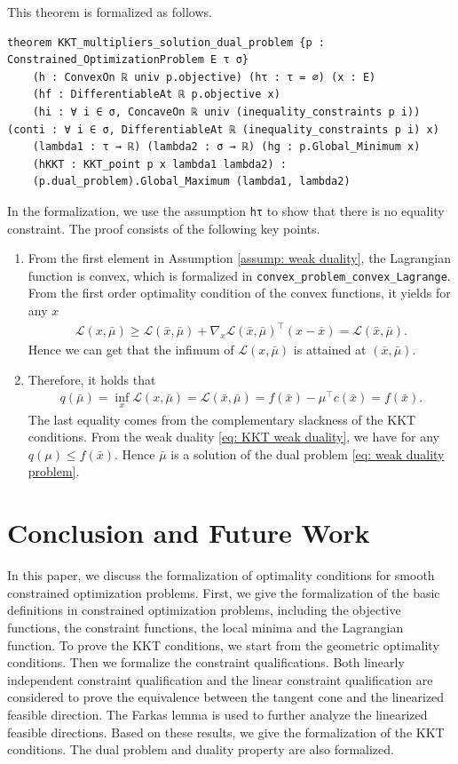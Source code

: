 \documentclass[sn-mathphys]{JORSC-jnl}%
\theoremstyle{thmstyleone}%
\theoremstyle{thmstylethree}%
\newcommand{\lean}[1]{\lstinline[language=lean, mathescape=true]{#1}}
\begin{document}
This theorem is formalized as follows.
\begin{lstlisting}
theorem KKT_multipliers_solution_dual_problem {p : Constrained_OptimizationProblem E τ σ}
    (h : ConvexOn ℝ univ p.objective) (hτ : τ = ∅) (x : E)
    (hf : DifferentiableAt ℝ p.objective x) 
    (hi : ∀ i ∈ σ, ConcaveOn ℝ univ (inequality_constraints p i)) (conti : ∀ i ∈ σ, DifferentiableAt ℝ (inequality_constraints p i) x)
    (lambda1 : τ → ℝ) (lambda2 : σ → ℝ) (hg : p.Global_Minimum x)
    (hKKT : KKT_point p x lambda1 lambda2) :
    (p.dual_problem).Global_Maximum (lambda1, lambda2) 
\end{lstlisting}
In the formalization, we use the assumption \lean{hτ} to show that there is no equality constraint. The proof consists of the following key points.
\begin{enumerate}
    \item From the first element in Assumption \ref{assump: weak duality}, the Lagrangian function is convex, which is formalized in \lean{convex_problem_convex_Lagrange}. From the first order optimality condition of the convex functions, it yields for any $x$
    \begin{align*}
        \mathcal{L}(x, \bar{\mu}) \geq \mathcal{L}(\bar{x}, \bar{\mu}) + \nabla_x \mathcal{L}(\bar{x}, \bar{\mu}) ^\top (x-\bar{x}) = \mathcal{L}(\bar{x}, \bar{\mu}).
    \end{align*}
    Hence we can get that the infimum of $\mathcal{L}(x, \bar{\mu})$ is attained at $(\bar{x}, \bar{\mu})$.
    \item Therefore, it holds that
    \begin{align*}
        q(\bar{\mu}) = \inf_x \mathcal{L}(x, \bar{\mu}) = \mathcal{L}(\bar{x}, \bar{\mu}) = f(\bar{x}) -\mu^\top c(\bar{x}) = f(\bar{x}).
    \end{align*}
    The last equality comes from the complementary slackness of the KKT conditions. From the weak duality \eqref{eq: KKT weak duality}, we have for any $q(\mu) \leq f(\bar{x})$. Hence $\bar{\mu}$ is a solution of the dual problem \eqref{eq: weak duality problem}. 
\end{enumerate}
\section{Conclusion and Future Work}\label{sec: conclution}
In this paper, we discuss the formalization of optimality conditions for smooth constrained optimization problems. First, we give the formalization of the basic definitions in constrained optimization problems, including the objective functions, the constraint functions, the local minima and the Lagrangian function. To prove the KKT conditions, we start from the geometric optimality conditions. Then we formalize the constraint qualifications. Both linearly independent constraint qualification and the linear constraint qualification are considered to prove the equivalence between the tangent cone and the linearized feasible direction. The Farkas lemma is used to further analyze the linearized feasible directions. Based on these results, we give the formalization of the KKT conditions. The dual problem and duality property are also formalized. 
\end{document}

